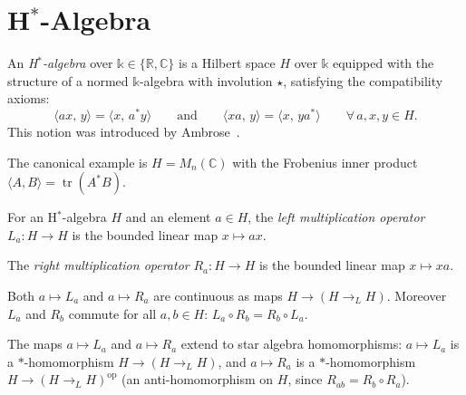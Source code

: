 \section{H\texorpdfstring{$^*$}{*}-Algebra}

\begin{definition}[H$^*$-algebra]
  \label{def:hstar_algebra}
  \leanok
  An \emph{H$^*$-algebra} over $\mathbb{k} \in \{\mathbb{R}, \mathbb{C}\}$ is a
  Hilbert space $H$ over $\mathbb{k}$ equipped with the structure of a normed
  $\mathbb{k}$-algebra with involution $\star$, satisfying the compatibility axioms:
  \[
    \langle a x,\, y \rangle = \langle x,\, a^* y \rangle
    \qquad \text{and} \qquad
    \langle x a,\, y \rangle = \langle x,\, y a^* \rangle
    \qquad \forall\, a, x, y \in H.
  \]
  This notion was introduced by Ambrose~\cite{Ambrose1945}.
\end{definition}

The canonical example is $H = M_n(\mathbb{C})$ with the Frobenius inner product
$\langle A, B \rangle = \operatorname{tr}(A^* B)$.

\begin{definition}
  \label{def:mul_operators}
  \leanok
  For an H$^*$-algebra $H$ and an element $a \in H$, the \emph{left multiplication
  operator} $L_a : H \to H$ is the bounded linear map $x \mapsto a x$.

  The \emph{right multiplication operator} $R_a : H \to H$ is the bounded linear map
  $x \mapsto x a$.

  Both $a \mapsto L_a$ and $a \mapsto R_a$ are continuous as maps $H \to (H \to_L H)$.
  Moreover $L_a$ and $R_b$ commute for all $a, b \in H$:
  $L_a \circ R_b = R_b \circ L_a$.
\end{definition}

The maps $a \mapsto L_a$ and $a \mapsto R_a$ extend to star algebra homomorphisms:
$a \mapsto L_a$ is a $*$-homomorphism $H \to (H \to_L H)$, and
$a \mapsto R_a$ is a $*$-homomorphism $H \to (H \to_L H)^{\mathrm{op}}$
(an anti-homomorphism on $H$, since $R_{ab} = R_b \circ R_a$).

